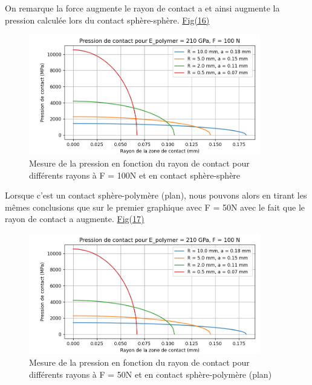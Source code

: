 \documentclass[a4paper,12pt]{article}
\begin{document}
On remarque la force augmente le rayon de contact a et ainsi augmente la pression calculée lors du contact sphère-sphère. \hyperref[fig:mon_image16]{Fig(16)}
\begin{figure}[H] 
	\centering
	\includegraphics[width=0.9\textwidth]{pre2.png} 
	\caption{Mesure de la pression en fonction du rayon de contact pour différents rayons à F = 100N et en contact sphère-sphère} 
	\label{fig:mon_image16} 
\end{figure}
Lorsque c'est un contact sphère-polymère (plan), nous pouvons alors en tirant les mêmes conclusions que sur le premier graphique avec F = 50N avec le fait que le rayon de contact a augmente. \hyperref[fig:mon_image17]{Fig(17)}
\begin{figure}[H] 
	\centering
	\includegraphics[width=0.9\textwidth]{pre2.png} 
	\caption{Mesure de la pression en fonction du rayon de contact pour différents rayons à F = 50N et en contact sphère-polymère (plan)} 
	\label{fig:mon_image17} 
\end{figure}
\end{document}
